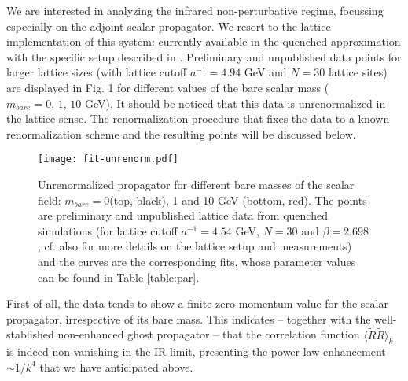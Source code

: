 We are interested in analyzing the infrared non-perturbative regime, focussing especially on
the adjoint scalar propagator. We resort to the lattice implementation of this system:
currently available in the quenched approximation with the specific setup described in
\cite{Maas:2010nc}. Preliminary and unpublished data points for larger lattice sizes (with
lattice cutoff $a^{-1}=4.94 $ GeV and $N=30$ lattice sites) \cite{axel} are displayed in Fig. 1
for different values of the bare scalar mass ($m_{bare}=0,\,1,\,10$ GeV). It should be noticed
that this data is unrenormalized in the lattice sense. The renormalization procedure that fixes
the data to a known renormalization scheme and the resulting points will be discussed below.

%
\begin{figure}[h!]
\center
\texttt{[image: fit-unrenorm.pdf]}
\caption{Unrenormalized propagator for different bare masses of the scalar field:
$m_{bare}=0$(top, black), 1 and 10 GeV (bottom, red). The points are preliminary and
unpublished lattice data from quenched simulations \cite{axel} (for lattice cutoff $a^{-1}=4.54
$ GeV, $N=30$ and $\beta=2.698$; cf. also \cite{Maas:2010nc} for more details on the lattice
setup and measurements) and the curves are the corresponding fits, whose parameter values can
be found in Table \ref{table:par}.}
\label{scalarlattfig}
\end{figure}
%


First of all, the data tends to show a finite zero-momentum value for the scalar propagator,
irrespective of its bare mass. This indicates   -- together with the well-stablished
non-enhanced ghost propagator -- that the correlation function $\langle \tilde{R} \tilde
R\rangle_k$ is indeed non-vanishing in the IR limit, presenting the power-law enhancement
$\sim1/k^4$ that we have anticipated above.

